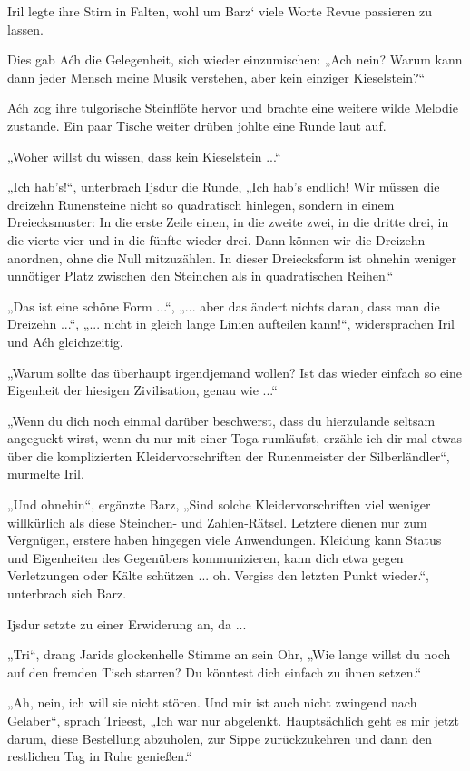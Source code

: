 Iril legte ihre Stirn in Falten, wohl um Barz‘ viele Worte Revue passieren zu lassen.

Dies gab Aćh die Gelegenheit, sich wieder einzumischen: „Ach nein? Warum kann dann jeder Mensch meine Musik verstehen, aber kein einziger Kieselstein?“

Aćh zog ihre tulgorische Steinflöte hervor und brachte eine weitere wilde Melodie zustande. Ein paar Tische weiter drüben johlte eine Runde laut auf.

„Woher willst du wissen, dass kein Kieselstein ...“

„Ich hab’s!“, unterbrach Ijsdur die Runde, „Ich hab’s endlich! Wir müssen die dreizehn Runensteine nicht so quadratisch hinlegen, sondern in einem Dreiecksmuster: In die erste Zeile einen, in die zweite zwei, in die dritte drei, in die vierte vier und in die fünfte wieder drei. Dann können wir die Dreizehn anordnen, ohne die Null mitzuzählen. In dieser Dreiecksform ist ohnehin weniger unnötiger Platz zwischen den Steinchen als in quadratischen Reihen.“

„Das ist eine schöne Form ...“, „... aber das ändert nichts daran, dass man die Dreizehn ...“, „... nicht in gleich lange Linien aufteilen kann!“, widersprachen Iril und Aćh gleichzeitig.

„Warum sollte das überhaupt irgendjemand wollen? Ist das wieder einfach so eine Eigenheit der hiesigen Zivilisation, genau wie ...“

„Wenn du dich noch einmal darüber beschwerst, dass du hierzulande seltsam angeguckt wirst, wenn du nur mit einer Toga rumläufst, erzähle ich dir mal etwas über die komplizierten Kleidervorschriften der Runenmeister der Silberländler“, murmelte Iril.

„Und ohnehin“, ergänzte Barz, „Sind solche Kleidervorschriften viel weniger willkürlich als diese Steinchen- und Zahlen-Rätsel. Letztere dienen nur zum Vergnügen, erstere haben hingegen viele Anwendungen. Kleidung kann Status und Eigenheiten des Gegenübers kommunizieren, kann dich etwa gegen Verletzungen oder Kälte schützen ... oh. Vergiss den letzten Punkt wieder.“, unterbrach sich Barz.

Ijsdur setzte zu einer Erwiderung an, da ...

„Tri“, drang Jarids glockenhelle Stimme an sein Ohr, „Wie lange willst du noch auf den fremden Tisch starren? Du könntest dich einfach zu ihnen setzen.“

„Ah, nein, ich will sie nicht stören. Und mir ist auch nicht zwingend nach Gelaber“, sprach Trieest, „Ich war nur abgelenkt. Hauptsächlich geht es mir jetzt darum, diese Bestellung abzuholen, zur Sippe zurückzukehren und dann den restlichen Tag in Ruhe genießen.“

